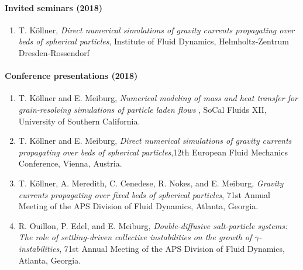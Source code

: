 \documentclass[11pt]{article}
\begin{document}
\paragraph*{Invited seminars (2018)}  
  \begin{enumerate}
  

\item T. K\"{o}llner, \textit{Direct numerical simulations of gravity currents propagating
over beds of spherical particles}, Institute of Fluid Dynamics, Helmholtz-Zentrum Dresden-Rossendorf
     

\end{enumerate}
     
  \paragraph*{Conference presentations (2018)}  
  \begin{enumerate}
  
\item T. K\"{o}llner and E. Meiburg, \textit{Numerical modeling of mass and heat transfer for grain-resolving simulations of particle laden flows  }, SoCal Fluids XII, University of Southern California.
  
\item T. K\"{o}llner and E. Meiburg, \textit{Direct numerical simulations of gravity currents propagating over beds of spherical particles},12th European Fluid Mechanics Conference, Vienna, Austria.
\item T. K\"{o}llner, A. Meredith,  C. Cenedese, R. Nokes, and E. Meiburg, \textit{Gravity currents propagating over fixed beds of spherical particles}, 71st Annual Meeting of the APS Division of Fluid Dynamics,  Atlanta, Georgia.
\item R. Ouillon, P. Edel, and E. Meiburg, \textit{Double-diffusive salt-particle systems: The role of settling-driven collective instabilities on the growth of $\gamma$-instabilities}, 71st Annual Meeting of the APS Division of Fluid Dynamics,  Atlanta, Georgia.
  
  \end{enumerate}
\end{document}
